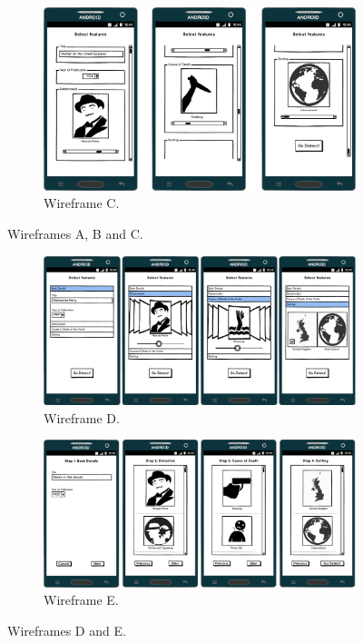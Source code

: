 \documentclass{mproj}
\begin{document}
\begin{figure}
	\begin{subfigure}{\textwidth}
		\includegraphics[width=\textwidth]{images/single_list}
		\caption{Wireframe C.}
		\label{fig:wireframeC}		
	\end{subfigure}
	\caption{Wireframes A, B and C.}
\end{figure}

\begin{figure}
	\centering
	
	\begin{subfigure}{\textwidth}
		\includegraphics[width=\textwidth]{images/single_accordion}
		\caption{Wireframe D.}
		\label{fig:wireframeD}		
	\end{subfigure}		
	
	\begin{subfigure}{\textwidth}
		\includegraphics[width=\textwidth]{images/multiple_list}
		\caption{Wireframe E.}
		\label{fig:wireframeE}		
	\end{subfigure}			
	\caption{Wireframes D and E.}
\end{figure}
\end{document}
